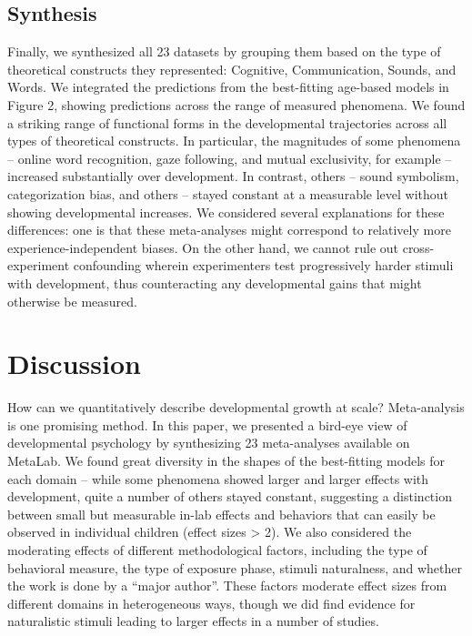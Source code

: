 \documentclass[10pt, letterpaper]{article}
\begin{document}
\hypertarget{synthesis}{%
\subsection{Synthesis}\label{synthesis}}

Finally, we synthesized all 23 datasets by grouping them based on the
type of theoretical constructs they represented: Cognitive,
Communication, Sounds, and Words. We integrated the predictions from the
best-fitting age-based models in Figure 2, showing predictions across
the range of measured phenomena. We found a striking range of functional
forms in the developmental trajectories across all types of theoretical
constructs. In particular, the magnitudes of some phenomena -- online
word recognition, gaze following, and mutual exclusivity, for example --
increased substantially over development. In contrast, others -- sound
symbolism, categorization bias, and others -- stayed constant at a
measurable level without showing developmental increases. We considered
several explanations for these differences: one is that these
meta-analyses might correspond to relatively more experience-independent
biases. On the other hand, we cannot rule out cross-experiment
confounding wherein experimenters test progressively harder stimuli with
development, thus counteracting any developmental gains that might
otherwise be measured.

\hypertarget{discussion}{%
\section{Discussion}\label{discussion}}

How can we quantitatively describe developmental growth at scale?
Meta-analysis is one promising method. In this paper, we presented a
bird-eye view of developmental psychology by synthesizing 23
meta-analyses available on MetaLab. We found great diversity in the
shapes of the best-fitting models for each domain -- while some
phenomena showed larger and larger effects with development, quite a
number of others stayed constant, suggesting a distinction between small
but measurable in-lab effects and behaviors that can easily be observed
in individual children (effect sizes \textgreater{} 2). We also
considered the moderating effects of different methodological factors,
including the type of behavioral measure, the type of exposure phase,
stimuli naturalness, and whether the work is done by a ``major author''.
These factors moderate effect sizes from different domains in
heterogeneous ways, though we did find evidence for naturalistic stimuli
leading to larger effects in a number of studies.
\end{document}

